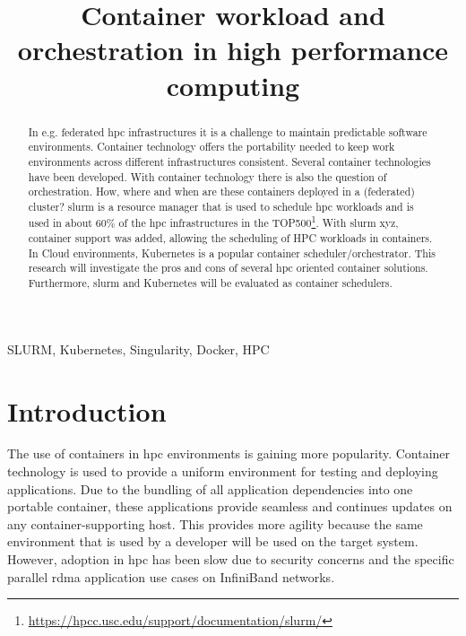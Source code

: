 \documentclass[conference]{IEEEtran}
\begin{document}
\title{Container workload and orchestration in high performance computing}

\author{
}

\maketitle

\begin{abstract}
In e.g. federated \gls{hpc} infrastructures it is a challenge to maintain predictable software environments. Container technology offers the portability needed to keep work environments across different infrastructures consistent. Several container technologies have been developed. With container technology there is also the question of orchestration. How, where and when are these containers deployed in a  (federated) cluster? \gls{slurm} is a resource manager that is used to schedule \gls{hpc} workloads and is used in about 60\% of the \gls{hpc} infrastructures in the TOP500\footnote{\url{https://hpcc.usc.edu/support/documentation/slurm/}}. With \gls{slurm} xyz, container support was added, allowing the scheduling of HPC workloads in containers. In Cloud environments, Kubernetes is a popular container scheduler/orchestrator. This research will investigate the pros and cons of several \gls{hpc} oriented container solutions. Furthermore, \gls{slurm} and Kubernetes will be evaluated as container schedulers.
\end{abstract}

\begin{IEEEkeywords}
SLURM, Kubernetes, Singularity, Docker, HPC
\end{IEEEkeywords}


\section{Introduction}
The use of containers in \gls{hpc} environments is gaining more popularity. Container technology is used to provide a uniform environment for testing and deploying applications. Due to the bundling of all application dependencies into one portable container, these applications provide seamless and continues updates on any container-supporting host. This provides more agility because the same environment that is used by a developer will be used on the target system. However, adoption in \gls{hpc} has been slow due to security concerns and the specific parallel \gls{rdma} application use cases on InfiniBand networks.
\end{document}
